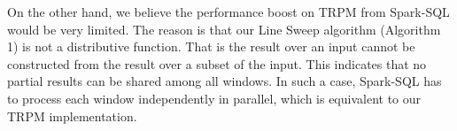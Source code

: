 On the other hand, we believe the performance boost on TRPM from Spark-SQL
would be very limited. The reason is that our 
Line Sweep algorithm (Algorithm 1) is not a 
distributive function. 
That is the result over an input cannot be constructed from
the result over a subset of the input. This indicates 
that no partial results can be shared among all windows.
In such a case, Spark-SQL has to process each
window independently in parallel, which is equivalent to our TRPM implementation.
%
%
%


